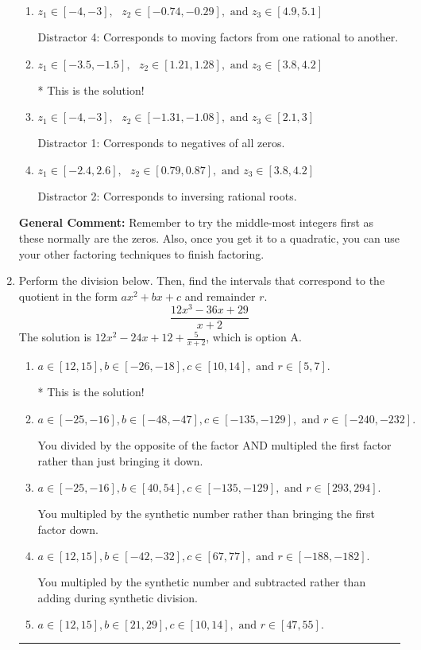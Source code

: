 \documentclass{extbook}[14pt]
\newcommand{\litem}[1]{\item #1

\rule{\textwidth}{0.4pt}}
\begin{document}
\begin{enumerate}
{\begin{enumerate}[label=\Alph*.]
 Distractor 3: Corresponds to negatives of all zeros AND inversing rational roots.
\item \( z_1 \in [-4, -3], \text{   }  z_2 \in [-0.74, -0.29], \text{   and   } z_3 \in [4.9, 5.1] \)

 Distractor 4: Corresponds to moving factors from one rational to another.
\item \( z_1 \in [-3.5, -1.5], \text{   }  z_2 \in [1.21, 1.28], \text{   and   } z_3 \in [3.8, 4.2] \)

* This is the solution!
\item \( z_1 \in [-4, -3], \text{   }  z_2 \in [-1.31, -1.08], \text{   and   } z_3 \in [2.1, 3] \)

 Distractor 1: Corresponds to negatives of all zeros.
\item \( z_1 \in [-2.4, 2.6], \text{   }  z_2 \in [0.79, 0.87], \text{   and   } z_3 \in [3.8, 4.2] \)

 Distractor 2: Corresponds to inversing rational roots.
\end{enumerate}

\textbf{General Comment:} Remember to try the middle-most integers first as these normally are the zeros. Also, once you get it to a quadratic, you can use your other factoring techniques to finish factoring.
}
\litem{
Perform the division below. Then, find the intervals that correspond to the quotient in the form $ax^2+bx+c$ and remainder $r$.
\[ \frac{12x^{3} -36 x + 29}{x + 2} \]The solution is \( 12x^{2} -24 x + 12 + \frac{5}{x + 2} \), which is option A.\begin{enumerate}[label=\Alph*.]
\item \( a \in [12, 15], b \in [-26, -18], c \in [10, 14], \text{ and } r \in [5, 7]. \)

* This is the solution!
\item \( a \in [-25, -16], b \in [-48, -47], c \in [-135, -129], \text{ and } r \in [-240, -232]. \)

 You divided by the opposite of the factor AND multipled the first factor rather than just bringing it down.
\item \( a \in [-25, -16], b \in [40, 54], c \in [-135, -129], \text{ and } r \in [293, 294]. \)

 You multipled by the synthetic number rather than bringing the first factor down.
\item \( a \in [12, 15], b \in [-42, -32], c \in [67, 77], \text{ and } r \in [-188, -182]. \)

 You multipled by the synthetic number and subtracted rather than adding during synthetic division.
\item \( a \in [12, 15], b \in [21, 29], c \in [10, 14], \text{ and } r \in [47, 55]. \)


\end{enumerate}}
\end{enumerate}
\end{document}
